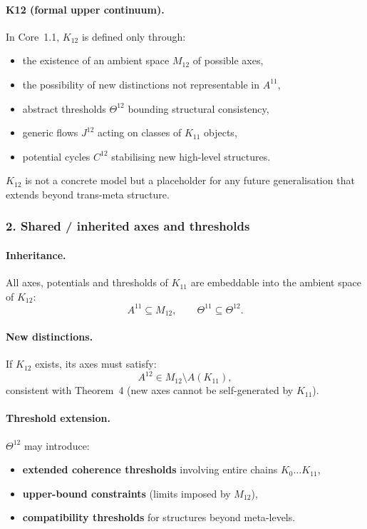 \paragraph{K12 (formal upper continuum).}
In Core~1.1, $K_{12}$ is defined only through:
\begin{itemize}
  \item the existence of an ambient space $M_{12}$ of possible axes,
  \item the possibility of new distinctions not representable in $A^{11}$,
  \item abstract thresholds $\Theta^{12}$ bounding structural consistency,
  \item generic flows $J^{12}$ acting on classes of $K_{11}$ objects,
  \item potential cycles $C^{12}$ stabilising new high-level structures.
\end{itemize}

$K_{12}$ is not a concrete model but a placeholder for any future
generalisation that extends beyond trans-meta structure.

\subsubsection{2. Shared / inherited axes and thresholds}

\paragraph{Inheritance.}
All axes, potentials and thresholds of $K_{11}$ are embeddable into the
ambient space of $K_{12}$:
\[
A^{11} \subseteq M_{12}, \qquad
\Theta^{11} \subseteq \Theta^{12}.
\]

\paragraph{New distinctions.}
If $K_{12}$ exists, its axes must satisfy:
\[
A^{12} \in M_{12} \setminus A(K_{11}),
\]
consistent with Theorem~4 (new axes cannot be self-generated by $K_{11}$).

\paragraph{Threshold extension.}
$\Theta^{12}$ may introduce:
\begin{itemize}
  \item \textbf{extended coherence thresholds} involving entire chains
        $K_0\dots K_{11}$,
  \item \textbf{upper-bound constraints} (limits imposed by $M_{12}$),
  \item \textbf{compatibility thresholds} for structures beyond meta-levels.
\end{itemize}

